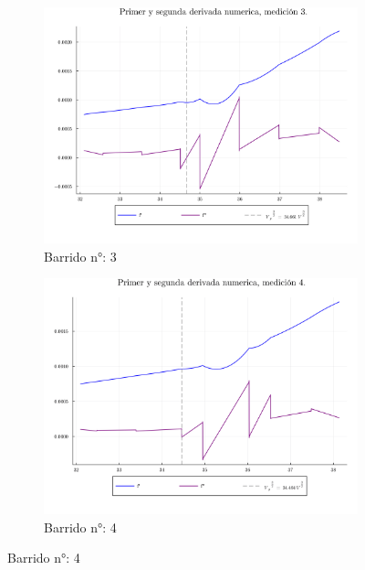 \begin{figure}[H]
\ContinuedFloat
\centering
\begin{subfigure}[b]{0.49\textwidth}
	\centering
	\includegraphics[width=\linewidth]{img/potderps3.png}
	\caption{Barrido n°: 3}
	\label{fig:potderps3}
\end{subfigure}
\hfill
\begin{subfigure}[b]{0.49\textwidth}
	\centering
	\includegraphics[width=\linewidth]{img/potderps4.png}
	\caption{Barrido n°: 4}
	\label{fig:potderps4}
\end{subfigure}

\end{figure}

